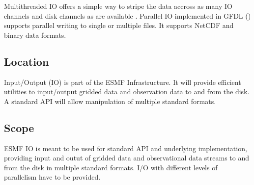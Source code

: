 Multithreaded IO offers a simple way to stripe the data accross as many
IO channels and disk channels as are available \cite{MPI-2, 
Balaji_Parallel_IO_1999, Balaji_Parallel_IO_2000}. Parallel IO implemented in 
GFDL (\cite{mpp_io}) supports parallel writing to single or multiple files. 
It supports NetCDF and binary data formats.



\subsection{Location}

Input/Output (IO) is part of the ESMF Infrastructure.  It will provide
efficient utilities to input/output gridded data and observation data
to and from the disk. A standard API will allow manipulation of multiple
standard formats.


\subsection{Scope}

ESMF IO is meant to be used for standard API and underlying implementation, 
providing input and outut of gridded data and observational data streams to 
and from the disk in multiple standard formats. I/O with different levels of 
parallelism have to be provided.  


















